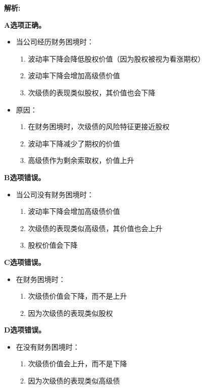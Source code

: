 \documentclass{article}
\newenvironment{explanation}
{\textbf{解析:}\par}
{\par}
\begin{document}
\begin{explanation}
    \textbf{A选项正确。}
    \begin{itemize}
        \item 当公司经历财务困境时：
        \begin{enumerate}
            \item 波动率下降会降低股权价值（因为股权被视为看涨期权）
            \item 波动率下降会增加高级债价值
            \item 次级债的表现类似股权，其价值也会下降
        \end{enumerate}
        \item 原因：
        \begin{enumerate}
            \item 在财务困境时，次级债的风险特征更接近股权
            \item 波动率下降减少了期权的价值
            \item 高级债作为剩余索取权，价值上升
        \end{enumerate}
    \end{itemize}
    
    \textbf{B选项错误。}
    \begin{itemize}
        \item 当公司没有财务困境时：
        \begin{enumerate}
            \item 波动率下降会增加高级债价值
            \item 次级债的表现类似高级债，其价值也会上升
            \item 股权价值会下降
        \end{enumerate}
    \end{itemize}
    
    \textbf{C选项错误。}
    \begin{itemize}
        \item 在财务困境时：
        \begin{enumerate}
            \item 次级债价值会下降，而不是上升
            \item 因为次级债的表现类似股权
        \end{enumerate}
    \end{itemize}
    
    \textbf{D选项错误。}
    \begin{itemize}
        \item 在没有财务困境时：
        \begin{enumerate}
            \item 次级债价值会上升，而不是下降
            \item 因为次级债的表现类似高级债
        \end{enumerate}
    \end{itemize}
\end{explanation}
\end{document}

